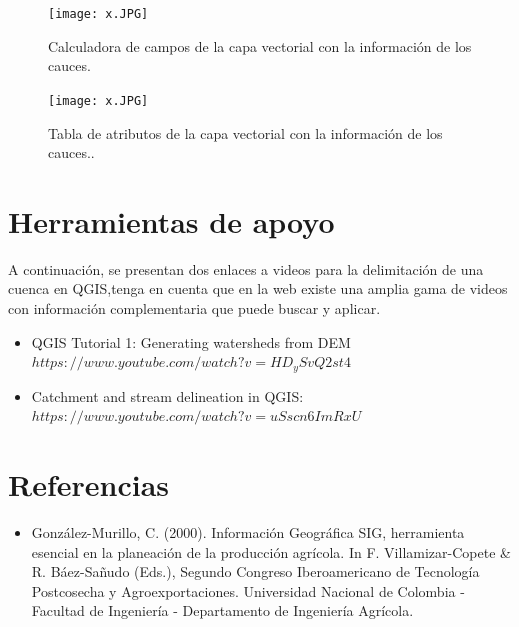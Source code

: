 \documentclass[12pt,hidelinks]{article}
\begin{document}
\begin{figure}[H]
    \centering
    \texttt{[image: x.JPG]}
    \caption {Calculadora de campos de la capa vectorial con la información de los cauces.  }
 \label{fig:my_label}
\end{figure}
\begin{figure}[H]
    \centering
    \texttt{[image: x.JPG]}
    \caption {Tabla de atributos de la capa vectorial con la información de los cauces..  }
 \label{fig:my_label}
\end{figure}

\section{Herramientas de apoyo }
A continuación, se presentan dos enlaces a videos para la delimitación de una cuenca en QGIS,tenga en cuenta que en la web existe una amplia gama de videos con información complementaria que puede buscar y aplicar.
\begin{itemize}
    

\item QGIS Tutorial 1: Generating watersheds from DEM
$https://www.youtube.com/watch?v=HD_ySvQ2st4$
\item Catchment and stream delineation in QGIS:
$https://www.youtube.com/watch?v=uSscn6ImRxU$
\end{itemize}
\section{Referencias }
\begin{itemize}
    \item González-Murillo, C. (2000). Información Geográfica SIG, herramienta esencial en la planeación de
la producción agrícola. In F. Villamizar-Copete & R. Báez-Sañudo (Eds.), Segundo Congreso
Iberoamericano de Tecnología Postcosecha y Agroexportaciones. Universidad Nacional de
Colombia - Facultad de Ingeniería - Departamento de Ingeniería Agrícola.
\end{itemize}
\end{document}

